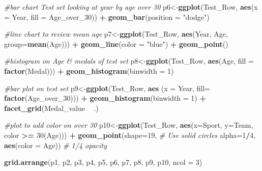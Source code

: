 \documentclass[]{article}
\newenvironment{Shaded}{\begin{snugshade}}{\end{snugshade}}
\newcommand{\KeywordTok}[1]{\textcolor[rgb]{0.13,0.29,0.53}{\textbf{#1}}}
\newcommand{\DataTypeTok}[1]{\textcolor[rgb]{0.13,0.29,0.53}{#1}}
\newcommand{\DecValTok}[1]{\textcolor[rgb]{0.00,0.00,0.81}{#1}}
\newcommand{\StringTok}[1]{\textcolor[rgb]{0.31,0.60,0.02}{#1}}
\newcommand{\CommentTok}[1]{\textcolor[rgb]{0.56,0.35,0.01}{\textit{#1}}}
\newcommand{\OperatorTok}[1]{\textcolor[rgb]{0.81,0.36,0.00}{\textbf{#1}}}
\newcommand{\NormalTok}[1]{#1}
\begin{document}
\begin{Shaded}
\begin{Highlighting}[]
\CommentTok{#bar chart Test set looking at year by age over 30}
\NormalTok{p6<-}\KeywordTok{ggplot}\NormalTok{(Test_Row, }\KeywordTok{aes}\NormalTok{(}\DataTypeTok{x =}\NormalTok{ Year, }\DataTypeTok{fill =}\NormalTok{ Age_over_}\DecValTok{30}\NormalTok{)) }\OperatorTok{+}
\StringTok{  }\KeywordTok{geom_bar}\NormalTok{(}\DataTypeTok{position =} \StringTok{"dodge"}\NormalTok{)}

\CommentTok{#line chart to review mean age}
\NormalTok{p7<-}\KeywordTok{ggplot}\NormalTok{(Test_Row, }\KeywordTok{aes}\NormalTok{(Year, Age, }\DataTypeTok{group=}\KeywordTok{mean}\NormalTok{(Age))) }\OperatorTok{+}
\StringTok{  }\KeywordTok{geom_line}\NormalTok{(}\DataTypeTok{color =} \StringTok{"blue"}\NormalTok{) }\OperatorTok{+}
\StringTok{  }\KeywordTok{geom_point}\NormalTok{()}

\CommentTok{#histogram on Age & medals of test set}
\NormalTok{p8<-}\KeywordTok{ggplot}\NormalTok{(Test_Row, }\KeywordTok{aes}\NormalTok{(Age, }\DataTypeTok{fill =} \KeywordTok{factor}\NormalTok{(Medal))) }\OperatorTok{+}
\StringTok{  }\KeywordTok{geom_histogram}\NormalTok{(}\DataTypeTok{binwidth =} \DecValTok{1}\NormalTok{)}

\CommentTok{#bar plot on test set}
\NormalTok{p9<-}\KeywordTok{ggplot}\NormalTok{(Test_Row, }\KeywordTok{aes}\NormalTok{ (}\DataTypeTok{x =}\NormalTok{ Year, }\DataTypeTok{fill=} \KeywordTok{factor}\NormalTok{(Age_over_}\DecValTok{30}\NormalTok{))) }\OperatorTok{+}
\StringTok{  }\KeywordTok{geom_histogram}\NormalTok{(}\DataTypeTok{binwidth =} \DecValTok{1}\NormalTok{) }\OperatorTok{+}
\StringTok{  }\KeywordTok{facet_grid}\NormalTok{(Medal_value }\OperatorTok{~}\StringTok{ }\NormalTok{.)}

\CommentTok{#plot to add color on over 30}
\NormalTok{p10<-}\KeywordTok{ggplot}\NormalTok{(Test_Row, }\KeywordTok{aes}\NormalTok{(}\DataTypeTok{x=}\NormalTok{Sport, }\DataTypeTok{y=}\NormalTok{Team, color }\OperatorTok{>=}\StringTok{ }\DecValTok{30}\NormalTok{(Age))) }\OperatorTok{+}
\StringTok{  }\KeywordTok{geom_point}\NormalTok{(}\DataTypeTok{shape=}\DecValTok{19}\NormalTok{,      }\CommentTok{# Use solid circles}
             \DataTypeTok{alpha=}\DecValTok{1}\OperatorTok{/}\DecValTok{4}\NormalTok{, }\KeywordTok{aes}\NormalTok{(}\DataTypeTok{color =}\NormalTok{ Age))     }\CommentTok{# 1/4 opacity}

\KeywordTok{grid.arrange}\NormalTok{(p1, p2, p3, p4, p5, p6, p7, p8, p9, p10, }\DataTypeTok{ncol =} \DecValTok{3}\NormalTok{)}
\end{Highlighting}
\end{Shaded}
\end{document}
